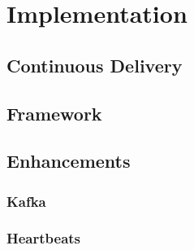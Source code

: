 \chapter{Implementation}

\section{Continuous Delivery}

\section{Framework}

\section{Enhancements}

\subsection{Kafka}

\subsection{Heartbeats}
